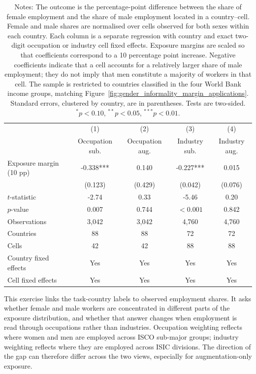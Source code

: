 \documentclass[11pt]{article}
\begin{document}
\begin{table}[!htbp]
\centering
\caption{Within-cell associations between sex-specific employment composition and automation margins.}
\label{tab:appendix_ilostat_gender_fe_baseline}
\small
\begin{tabular}{lcccc}
\toprule
 & (1) & (2) & (3) & (4) \\
 & Occupation sub. & Occupation aug. & Industry sub. & Industry aug. \\
\midrule
Exposure margin (10 pp) & -0.338*** & 0.140 & -0.227*** & 0.015 \\
 & (0.123) & (0.429) & (0.042) & (0.076) \\
$t$-statistic & -2.74 & 0.33 & -5.46 & 0.20 \\
$p$-value & 0.007 & 0.744 & $<0.001$ & 0.842 \\
\midrule
Observations & 3,042 & 3,042 & 4,760 & 4,760 \\
Countries & 88 & 88 & 72 & 72 \\
Cells & 42 & 42 & 88 & 88 \\
Country fixed effects & Yes & Yes & Yes & Yes \\
Cell fixed effects & Yes & Yes & Yes & Yes \\
\bottomrule
\end{tabular}
\caption*{\scriptsize Notes: The outcome is the percentage-point difference between the share of female employment and the share of male employment located in a country--cell. Female and male shares are normalised over cells observed for both sexes within each country. Each column is a separate regression with country and exact two-digit occupation or industry cell fixed effects. Exposure margins are scaled so that coefficients correspond to a 10 percentage point increase. Negative coefficients indicate that a cell accounts for a relatively larger share of male employment; they do not imply that men constitute a majority of workers in that cell. The sample is restricted to countries classified in the four World Bank income groups, matching Figure~\ref{fig:gender_informality_margin_applications}. Standard errors, clustered by country, are in parentheses. Tests are two-sided. $^{*}p<0.10$, $^{**}p<0.05$, $^{***}p<0.01$.}
\end{table}


This exercise links the task-country labels to observed employment shares. It asks whether female and male workers are concentrated in different parts of the exposure distribution, and whether that answer changes when employment is read through occupations rather than industries. Occupation weighting reflects where women and men are employed across ISCO sub-major groups; industry weighting reflects where they are employed across ISIC divisions. The direction of the gap can therefore differ across the two views, especially for augmentation-only exposure.
\end{document}
